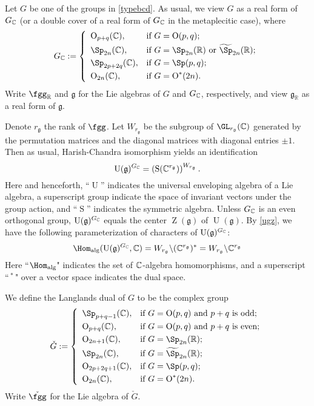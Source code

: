 \documentclass[12pt,a4paper]{amsart}
\newcommand{\oO}{\operatorname{O}}
\newcommand{\oS}{\operatorname{S}}
\newcommand{\oZ}{\operatorname{Z}}
\newcommand{\oU}{\operatorname{U}}
\newcommand{\g}{\mathfrak g}
\newcommand{\R}{\mathbb R}
\newcommand{\be}{\begin {equation}}
\newcommand{\ee}{\end {equation}}
\numberwithin{equation}{section}
\theoremstyle{remark}
\begin{document}
Let $G$ be one of the groups in   \eqref{typebcd}.  As usual, we view $G$ as  a real form of $G_{\mathbb{C}}$ (or a double cover of a real form of $G_{\mathbb{C}}$ in the metaplecitic case), where
\[
  G_\C:=
  \left\{
    \begin{array}{ll}
      \oO_{p+q}(\C) , & \hbox{if $G=\oO(p,q)$;} \smallskip\\
    \Sp_{2n}(\C) , & \hbox{if $G=\Sp_{2n}(\R)$ or $\widetilde \Sp_{2n}(\R)$;} \smallskip \\
  \Sp_{2p+2q}(\C) , & \hbox{if $G=\Sp(p,q)$;} \smallskip \\
 \oO_{2n}(\C) , & \hbox{if $G=\oO^*(2n)$.} \\
    \end{array}
  \right.
\]
Write $\fgg_\R$ and $\g$ for the Lie algebras of $G$ and $G_{\mathbb{C}}$, respectively, and view $\g_\R$ as a real form of $\g$.

Denote $r_\g$ the rank of $\fgg$. Let $W_{r_\g}$ be the subgroup of $\GL_{r_\g}(\C)$ generated
by the permutation matrices and the diagonal matrices with diagonal entries
$\pm 1$.
 Then as usual, Harish-Chandra
isomorphism yields an identification
\be\label{ugz}
  \oU(\g)^{G_\C}=\left(\oS(\C^{r_\g})\right)^{W_{r_\g}}.
\ee
Here and henceforth,  ``$\oU$'' indicates the universal enveloping algebra of a Lie algebra,  a superscript group indicate the
space of invariant vectors under the group action, and  ``$\oS$'' indicates
the symmetric algebra. Unless $G_{\mathbb{C}}$ is an even orthogonal group,
$\oU(\g)^{G_\C}$ equals the center $\oZ(\g)$ of $\oU(\g)$.
By \eqref{ugz}, we have the following parameterization of  characters of $\oU(\g)^{G_\C}$:
\[
  \Hom_{\mathrm{alg}}(\oU(\g)^{G_\C}, \C)=W_{r_\g} \backslash (\C^{r_\g})^*= W_{r_\g}\backslash \C^{r_\g}
\]
Here ``$ \Hom_{\mathrm{alg}}$" indicates the set of $\mathbb{C}$-algebra homomorphisms, and a superscript ``$\,^*\,$" over a vector space indicates the dual space.

We define the Langlands dual of $G$ to be the complex group
\[
  \check G:=
  \left\{
    \begin{array}{ll}
      \Sp_{p+q-1}(\C) , & \hbox{if $G=\oO(p,q)$ and $p+q$ is odd;} \smallskip\\
    \oO_{p+q}(\C) , & \hbox{if $G=\oO(p,q)$ and $p+q$ is even;} \smallskip \\
    \oO_{2n+1}(\C) , & \hbox{if $G=\Sp_{2n}(\R)$;} \smallskip \\
   \Sp_{2n}(\C) , & \hbox{if $G=\widetilde \Sp_{2n}(\R)$;} \smallskip \\
 \oO_{2p+2q+1}(\C) , & \hbox{if $G=\Sp(p,q)$;} \smallskip \\
 \oO_{2n}(\C) , & \hbox{if $G=\oO^*(2n)$.} \\
    \end{array}
  \right.
\]
 Write $\check \fgg$ for the Lie algebra of $\check G$.
\end{document}
